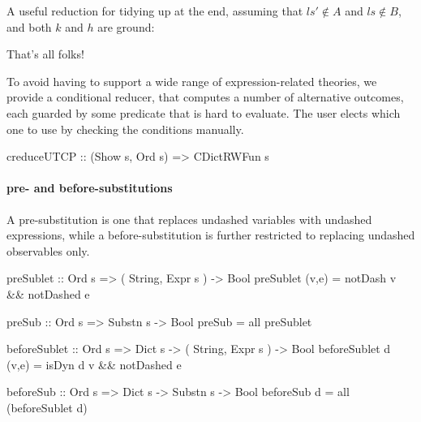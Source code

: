 A useful reduction for tidying up at the end,
assuming that $ls' \notin A$ and $ls \notin B$, and both $k$ and $h$
are ground:


That's all folks!




To avoid having to support a wide range of expression-related theories,
we provide a conditional reducer, that computes
a number of alternative outcomes, each guarded by some predicate
that is hard to evaluate.
The user elects which one to use by checking the conditions manually.

\begin{code}
creduceUTCP :: (Show s, Ord s) => CDictRWFun s
\end{code}

\paragraph{pre- and before-substitutions}
A pre-substitution is one that replaces undashed variables with
undashed expressions, while a before-substitution is further restricted
to replacing undashed observables only.
\begin{code}
preSublet :: Ord s => ( String, Expr s ) -> Bool
preSublet (v,e) = notDash v && notDashed e

preSub :: Ord s => Substn s -> Bool
preSub = all preSublet

beforeSublet :: Ord s => Dict s -> ( String, Expr s ) -> Bool
beforeSublet d (v,e) = isDyn d v && notDashed e

beforeSub :: Ord s => Dict s -> Substn s -> Bool
beforeSub d = all (beforeSublet d)
\end{code}

